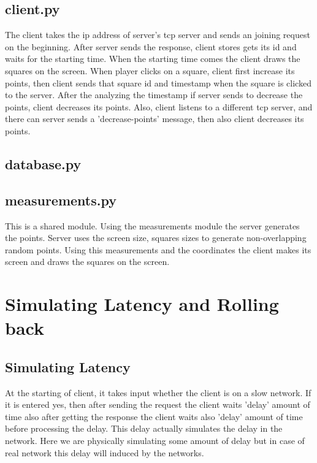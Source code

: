 \documentclass[manuscript,screen,review,nonacm]{acmart}
\begin{document}
\subsection{client.py}
The client takes the ip address of server's tcp server and sends an joining request on the beginning. After server sends the response, client stores gets its id and waits for the starting time. When the starting time comes the client draws the squares on the screen.
When player clicks on a square, client first increase its points, then client sends that square id and timestamp when the square is clicked to the server. After the analyzing the timestamp if server sends to decrease the points, client decreases its points. 
Also, client listens to a different tcp server, and there can server sends a 'decrease-points' message, then also client decreases its points.

\subsection{database.py}

\subsection{measurements.py}
This is a shared module. Using the measurements module the server generates the points. Server uses the screen size, squares sizes to generate non-overlapping random points. Using this measurements and the coordinates the client makes its screen and draws the squares on the screen.

\section{Simulating Latency and Rolling back}

\subsection{Simulating Latency}
At the starting of client, it takes input whether the client is on a slow network. If it is entered yes, then after sending the request the client waits 'delay' amount of time also after getting the response the client waits also 'delay' amount of time before processing the delay. 
This delay actually simulates the delay in the network. Here we are physically simulating some amount of delay but in case of real network this delay will induced by the networks.
\end{document}
